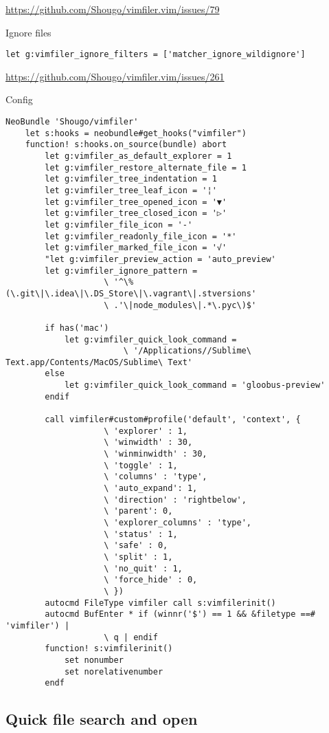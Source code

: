 \url{https://github.com/Shougo/vimfiler.vim/issues/79}

Ignore files
\begin{verbatim}
let g:vimfiler_ignore_filters = ['matcher_ignore_wildignore']
\end{verbatim}
\url{https://github.com/Shougo/vimfiler.vim/issues/261}

Config
\begin{verbatim}
NeoBundle 'Shougo/vimfiler'
    let s:hooks = neobundle#get_hooks("vimfiler")
    function! s:hooks.on_source(bundle) abort
        let g:vimfiler_as_default_explorer = 1
        let g:vimfiler_restore_alternate_file = 1
        let g:vimfiler_tree_indentation = 1
        let g:vimfiler_tree_leaf_icon = '¦'
        let g:vimfiler_tree_opened_icon = '▼'
        let g:vimfiler_tree_closed_icon = '▷'
        let g:vimfiler_file_icon = '-'
        let g:vimfiler_readonly_file_icon = '*'
        let g:vimfiler_marked_file_icon = '√'
        "let g:vimfiler_preview_action = 'auto_preview'
        let g:vimfiler_ignore_pattern =
                    \ '^\%(\.git\|\.idea\|\.DS_Store\|\.vagrant\|.stversions'
                    \ .'\|node_modules\|.*\.pyc\)$'

        if has('mac')
            let g:vimfiler_quick_look_command =
                        \ '/Applications//Sublime\ Text.app/Contents/MacOS/Sublime\ Text'
        else
            let g:vimfiler_quick_look_command = 'gloobus-preview'
        endif

        call vimfiler#custom#profile('default', 'context', {
                    \ 'explorer' : 1,
                    \ 'winwidth' : 30,
                    \ 'winminwidth' : 30,
                    \ 'toggle' : 1,
                    \ 'columns' : 'type',
                    \ 'auto_expand': 1,
                    \ 'direction' : 'rightbelow',
                    \ 'parent': 0,
                    \ 'explorer_columns' : 'type',
                    \ 'status' : 1,
                    \ 'safe' : 0,
                    \ 'split' : 1,
                    \ 'no_quit' : 1,
                    \ 'force_hide' : 0,
                    \ })
        autocmd FileType vimfiler call s:vimfilerinit()
        autocmd BufEnter * if (winnr('$') == 1 && &filetype ==# 'vimfiler') |
                    \ q | endif
        function! s:vimfilerinit()
            set nonumber
            set norelativenumber
        endf
\end{verbatim}


\subsection{Quick file search and open}
\label{sec:vim-file-search-and-open}


